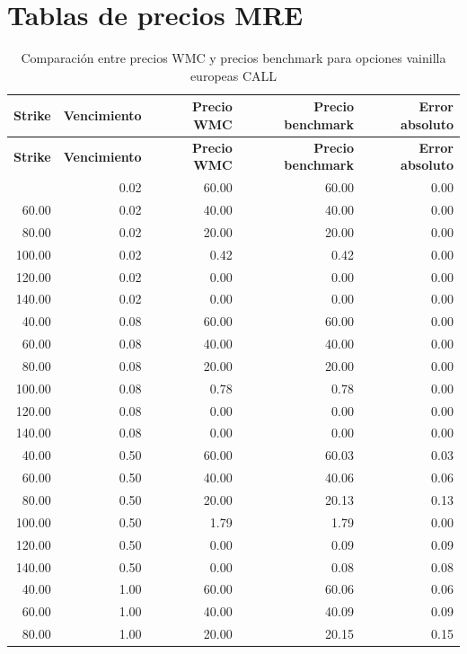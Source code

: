 \chapter{Tablas de precios MRE}

\begingroup
\scriptsize
\renewcommand{\arraystretch}{0.82}
\setlength{\tabcolsep}{4pt}
\begin{longtable}{@{}rrrrr@{}}
\caption{Comparación entre precios WMC y precios benchmark para opciones vainilla europeas CALL}\label{tab:wmc_vs_ref_call}\\
\toprule
\textbf{Strike} & \textbf{Vencimiento} & \textbf{Precio WMC} & \textbf{Precio benchmark} & \textbf{Error absoluto} \\
\midrule
\endfirsthead
\toprule
\textbf{Strike} & \textbf{Vencimiento} & \textbf{Precio WMC} & \textbf{Precio benchmark} & \textbf{Error absoluto} \\
\midrule
\endhead
\bottomrule
\endlastfoot
40.00  & 0.02  & 60.00 & 60.00 & 0.00 \\
60.00  & 0.02  & 40.00 & 40.00 & 0.00 \\
80.00  & 0.02  & 20.00 & 20.00 & 0.00 \\
100.00 & 0.02  & 0.42  & 0.42  & 0.00 \\
120.00 & 0.02  & 0.00  & 0.00  & 0.00 \\
140.00 & 0.02  & 0.00  & 0.00  & 0.00 \\
40.00  & 0.08  & 60.00 & 60.00 & 0.00 \\
60.00  & 0.08  & 40.00 & 40.00 & 0.00 \\
80.00  & 0.08  & 20.00 & 20.00 & 0.00 \\
100.00 & 0.08  & 0.78  & 0.78  & 0.00 \\
120.00 & 0.08  & 0.00  & 0.00  & 0.00 \\
140.00 & 0.08  & 0.00  & 0.00  & 0.00 \\
40.00  & 0.50  & 60.00 & 60.03 & 0.03 \\
60.00  & 0.50  & 40.00 & 40.06 & 0.06 \\
80.00  & 0.50  & 20.00 & 20.13 & 0.13 \\
100.00 & 0.50  & 1.79  & 1.79  & 0.00 \\
120.00 & 0.50  & 0.00  & 0.09  & 0.09 \\
140.00 & 0.50  & 0.00  & 0.08  & 0.08 \\
40.00  & 1.00  & 60.00 & 60.06 & 0.06 \\
60.00  & 1.00  & 40.00 & 40.09 & 0.09 \\
80.00  & 1.00  & 20.00 & 20.15 & 0.15 \\

\end{longtable}
